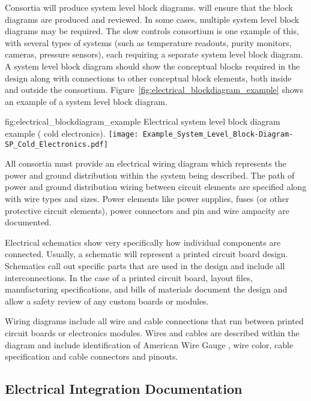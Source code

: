 Consortia will produce system level block diagrams. 
will ensure that the block diagrams are produced and reviewed.  In
some cases, multiple system level block diagrams may be required.  The
slow controls consortium is one example of this, with several types of
systems (such as temperature readouts, purity monitors, cameras,
pressure sensors), each requiring a separate system level block
diagram. A system level block diagram should show the conceptual
blocks required in the design along with connections to other
conceptual block elements, both inside and outside the consortium.
Figure~\ref{fig:electrical_blockdiagram_example} shows an example of a
system level block diagram.
\begin{dunefigure}{fig:electrical_blockdiagram_example}
  {Electrical system level block diagram example ( cold electronics).}
 \texttt{[image: Example\_System\_Level\_Block-Diagram-SP\_Cold\_Electronics.pdf]}
\end{dunefigure}


All consortia must provide an electrical wiring diagram which
represents the power and ground distribution within the system being
described.  The path of power and ground distribution wiring between
circuit elements are specified along with wire types and sizes.  Power
elements like power supplies, fuses (or other protective circuit
elements), power connectors and pin and wire ampacity are documented.


Electrical schematics show very specifically how individual
components are connected.  Usually, a schematic will represent a
printed circuit board design.  Schematics call out specific
parts that are used in the design and include all interconnections.
In the case of a printed circuit board, layout files, manufacturing
specifications, and bills of materials document
the design and allow a safety review of any custom boards or
modules.


Wiring diagrams include all wire and cable connections that run
between printed circuit boards or electronics modules.  Wires and
cables are described within the diagram and include identification of
American Wire Gauge , wire color, cable specification and
cable connectors and pinouts.





\subsection{Electrical Integration Documentation}
\label{sec:fdsp-coord-integ-electrical}

